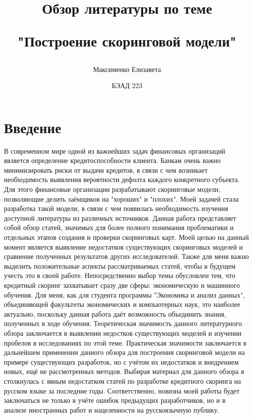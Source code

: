\documentclass[a4paper,14pt]{article}
\title{\begin{center} Обзор литературы по теме \end{center} \newline "Построение скоринговой модели" }
\author{Максименко Елизавета}
\date{БЭАД 223}
\begin{document}
\maketitle

\section*{Введение}
В современном мире одной из важнейших задач финансовых организаций является определение кредитоспособности клиента. Банкам очень важно минимизировать риски от выдачи кредитов, в связи с чем возникает необходимость выявления вероятности дефолта каждого конкретного субъекта. Для этого финансовые организации разрабатывают скоринговые модели, позволяющие делить заёмщиков на "хороших" и "плохих". \newline
Моей задачей стала разработка такой модели, в связи с чем появилась необходимость изучения доступной литературы из различных источников. Данная работа представляет собой обзор статей, значимых для более полного понимания проблематики и отдельных этапов создания и проверки скоринговых карт. Моей целью на данный момент является выявление недостатков существующих скоринговых моделей и сравнение полученных результатов других исследователей. Также для меня важно выделить положительные аспекты рассматриваемых статей, чтобы в будущем учесть это в своей работе. \newline
Непосредственно выбор темы обусловлен тем, что кредитный скоринг захватывает сразу две сферы: экономическую и машинного обучения. Для меня, как для студента программы "Экономика и анализ данных", объединяющей факультеты экономических и компьютерных наук, это наиболее актуально, поскольку данная работа даёт возможность объединить знания, полученных в ходе обучения. \newline
Теоретическая значимость данного литературного обзора заключается в выявлении недостков существующих моделей и изучении пробелов в исследованиях по этой теме.  \newline
Практическая значимости заключается в дальнейшем применении данного обзора для построения скоринговой модели на примере существующих разработок, но с учётом их недостатков и внедрением новых, ещё не рассмотренных методов.  \newline
Выбирая материал для данного обзора я столкнулась с явным недостатком статей по разработке кредитного скоринга на русском языке за последние годы. Соответственно, новизна моей работы будет заключаться не только в учёте ошибок предыдущих разработчиков, но и в анализе иностранных работ и нацеленности на русскоязычную публику. 
\end{document}
